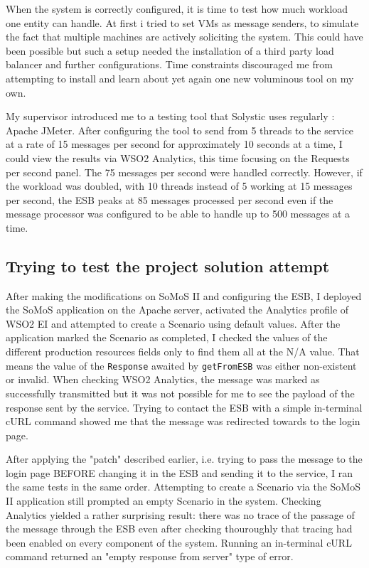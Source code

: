 \documentclass[12pt,a4paper,twoside]{article}
\begin{document}
When the system is correctly configured, it is time to test how much workload one entity can handle. At first i tried to set VMs as message senders, to simulate the fact that multiple machines are actively soliciting the system. This could have been possible but such a setup needed the installation of a third party load balancer and further configurations. Time constraints discouraged me from attempting to install and learn about yet again one new voluminous tool on my own. 

My supervisor introduced me to a testing tool that Solystic uses regularly : Apache JMeter. After configuring the tool to send from 5 threads to the service at a rate of 15 messages per second for approximately 10 seconds at a time, I could view the results via WSO2 Analytics, this time focusing on the Requests per second panel. The 75 messages per second were handled correctly. However, if the workload was doubled, with 10 threads instead of 5 working at 15 messages per second, the ESB peaks at 85 messages processed per second even if the message processor was configured to be able to handle up to 500 messages at a time.
\subsection{Trying to test the project solution attempt}
After making the modifications on SoMoS II and configuring the ESB, I deployed the SoMoS application on the Apache server, activated the Analytics profile of WSO2 EI and attempted to create a Scenario using default values. After the application marked the Scenario as completed, I checked the values of the different production resources fields only to find them all at the N/A value. That means the value of the \texttt{Response} awaited by \texttt{getFromESB} was either non-existent or invalid. When checking WSO2 Analytics, the message was marked as successfully transmitted but it was not possible for me to see the payload of the response sent by the service. 
Trying to contact the ESB with a simple in-terminal cURL command showed me that the message was redirected towards to the login page.

After applying the "patch" described earlier, i.e. trying to pass the message to the login page BEFORE changing it in the ESB and sending it to the service, I ran the same tests in the same order. Attempting to create a Scenario via the SoMoS II application still prompted an empty Scenario in the system. Checking Analytics yielded a rather surprising result: there was no trace of the passage of the message through the ESB even after checking thouroughly that tracing had been enabled on every component of the system. Running an in-terminal cURL command returned an "empty response from server" type of error. 
\end{document}
